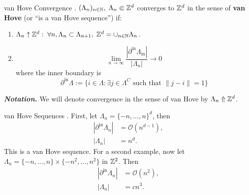 \documentclass{article}
\begin{document}
\begin{Definition}{van Hove Convergence}
.  $(\Lambda_{n})_{n\in\mathbb{N}}, \; \Lambda_n \Subset \mathbb{Z}^d$ converges to $\mathbb{Z}^d$ in the sense of \textbf{van Hove} (or ``is a van Hove sequence'') if:
\begin{enumerate}
\item $\Lambda_n \uparrow \mathbb{Z}^d: \; \forall n , \Lambda_n \subset \Lambda_{n + 1}, \; \mathbb{Z}^d = \cup_{n \in \mathbb{N}} \Lambda_{n}$.
\item
  \begin{equation}
    \lim_{n \to \infty} \frac{\left| \partial^{\mathrm{in}} \Lambda_{\mathrm{in}} \right|}{\left| \Lambda_n \right|} \rightarrow 0
  \end{equation}
  where the inner boundary is
  \begin{equation}
    \partial^{\mathrm{in}}\Lambda := \{ i \in \Lambda : \exists j \in \Lambda^C \text{ such that } \lVert j - i \rVert = 1 \}
  \end{equation}
\end{enumerate}
  \textbf{\textit{Notation.}} We will denote convergence in the sense of van Hove by $\Lambda_n \Uparrow \mathbb{Z}^d$.
\end{Definition}

\begin{Example}{van Hove Sequences}
  .  First, let $\Lambda_{n} = \{ - n, \dots, n \}^{d}$, then
  \begin{align}
    \left| \partial^{\mathrm{in}} \Lambda_n \right| &= \mathcal{O}(n^{d-1}),\\
    \left| \Lambda_n \right| &= n^d.
  \end{align}
  This is a van Hove sequence. For a second example, now let $\Lambda_n = \{ - n, \dots, n \} \times \{ - n^2 , \dots, n^2 \}$ in $\mathbb{Z}^2$. Then 
  \begin{align}
  \label{eq:8}
    \left| \partial^{\mathrm{in}} \Lambda_n \right| &= \mathcal{O}(n^2), \\
    \left| \Lambda_n \right| &= cn^3.
  \end{align}
\end{Example}
\end{document}
